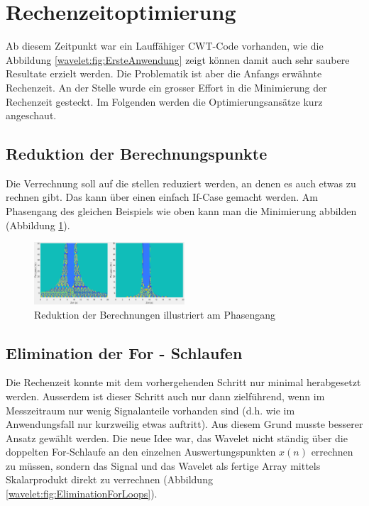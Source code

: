 %
%
%
%
\section{Rechenzeitoptimierung
\label{wavelets:section:teil3}}
Ab diesem Zeitpunkt war ein Lauffähiger CWT-Code vorhanden, wie die Abbildung \ref{wavelet:fig:ErsteAnwendung} zeigt können damit auch sehr saubere Resultate erzielt werden. Die Problematik ist aber die Anfangs erwähnte Rechenzeit. An der Stelle wurde ein grosser Effort in die Minimierung der Rechenzeit gesteckt. Im Folgenden werden die Optimierungsansätze kurz angeschaut.

\subsection{Reduktion der Berechnungspunkte
\label{wavelets:subsection:ReduktionBerechnungspunkte}}
Die Verrechnung soll auf die stellen reduziert werden, an denen es auch etwas zu rechnen gibt. Das kann über einen einfach If-Case gemacht werden. Am Phasengang des gleichen Beispiels wie oben kann man die Minimierung abbilden (Abbildung \ref{wavelet:fig:CwtCalcReduct}).

\begin{figure}
	\centering
	\includegraphics[width=0.5\textwidth]{papers/wavelets/images/13_CWT-CalcReduct.png}
	\caption{Reduktion der Berechnungen illustriert am Phasengang}
	\label{wavelet:fig:CwtCalcReduct}
\end{figure}

\subsection{Elimination der For - Schlaufen
	\label{wavelets:subsection:EliminationForSchlaufen}}
Die Rechenzeit konnte mit dem vorhergehenden Schritt nur minimal herabgesetzt werden. Ausserdem ist dieser Schritt auch nur dann zielführend, wenn im Messzeitraum nur wenig Signalanteile vorhanden sind (d.h. wie im Anwendungsfall nur kurzweilig etwas auftritt). Aus diesem Grund musste besserer Ansatz gewählt werden. 
Die neue Idee war, das Wavelet nicht ständig über die doppelten For-Schlaufe an den einzelnen Auswertungspunkten $x(n)$ errechnen zu müssen, sondern das Signal und das Wavelet als fertige Array mittels Skalarprodukt direkt zu verrechnen (Abbildung \ref{wavelet:fig:EliminationForLoops}).

